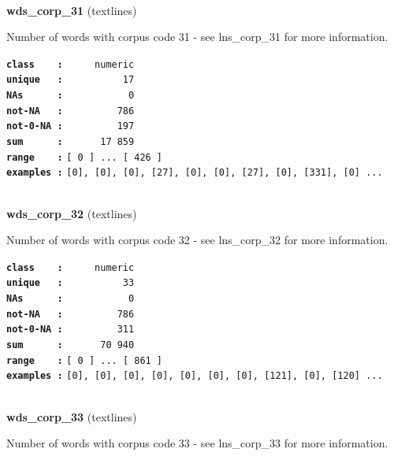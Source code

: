 \documentclass[]{article}
\begin{document}
~

\textbf{wds\_corp\_31} (textlines)

Number of words with corpus code 31 - see lns\_corp\_31 for more
information.

\textbf{\texttt{class\ \ \ \ :}} \texttt{~~~~~numeric}\\
\textbf{\texttt{unique\ \ \ :}} \texttt{~~~~~~~~~~17}\\
\textbf{\texttt{NAs\ \ \ \ \ \ :}} \texttt{~~~~~~~~~~~0}\\
\textbf{\texttt{not-NA\ \ \ :}} \texttt{~~~~~~~~~786}\\
\textbf{\texttt{not-0-NA\ :}} \texttt{~~~~~~~~~197}\\
\textbf{\texttt{sum\ \ \ \ \ \ :}} \texttt{~~~~~~17~859}\\
\textbf{\texttt{range\ \ \ \ :}}
\texttt{{[}\ 0\ {]}\ ...\ {[}\ 426\ {]}}\\
\textbf{\texttt{examples\ :}}
\texttt{{[}0{]},\ {[}0{]},\ {[}0{]},\ {[}27{]},\ {[}0{]},\ {[}0{]},\ {[}27{]},\ {[}0{]},\ {[}331{]},\ {[}0{]}\ ...}\\

~

\textbf{wds\_corp\_32} (textlines)

Number of words with corpus code 32 - see lns\_corp\_32 for more
information.

\textbf{\texttt{class\ \ \ \ :}} \texttt{~~~~~numeric}\\
\textbf{\texttt{unique\ \ \ :}} \texttt{~~~~~~~~~~33}\\
\textbf{\texttt{NAs\ \ \ \ \ \ :}} \texttt{~~~~~~~~~~~0}\\
\textbf{\texttt{not-NA\ \ \ :}} \texttt{~~~~~~~~~786}\\
\textbf{\texttt{not-0-NA\ :}} \texttt{~~~~~~~~~311}\\
\textbf{\texttt{sum\ \ \ \ \ \ :}} \texttt{~~~~~~70~940}\\
\textbf{\texttt{range\ \ \ \ :}}
\texttt{{[}\ 0\ {]}\ ...\ {[}\ 861\ {]}}\\
\textbf{\texttt{examples\ :}}
\texttt{{[}0{]},\ {[}0{]},\ {[}0{]},\ {[}0{]},\ {[}0{]},\ {[}0{]},\ {[}0{]},\ {[}121{]},\ {[}0{]},\ {[}120{]}\ ...}\\

~

\textbf{wds\_corp\_33} (textlines)

Number of words with corpus code 33 - see lns\_corp\_33 for more
information.
\end{document}
